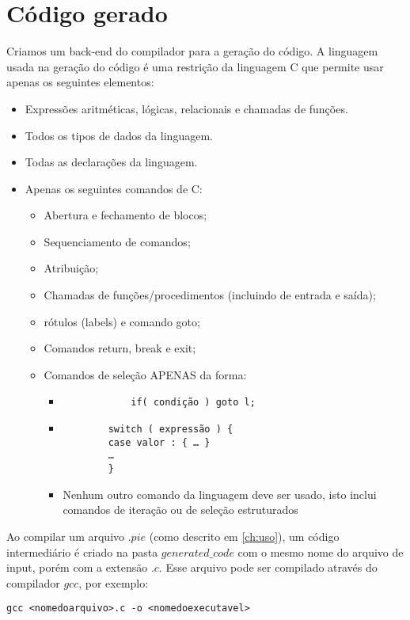 \section{Código gerado}
Criamos um back-end do compilador para a geração do código. 
A linguagem usada na geração do código é uma restrição da linguagem C que permite usar apenas os seguintes elementos:
\begin{itemize}
	\item Expressões aritméticas, lógicas, relacionais e chamadas de funções.
	\item Todos os tipos de dados da linguagem.
	\item Todas as declarações da linguagem.
	\item Apenas os seguintes comandos de C:
	\begin{itemize}
		\item Abertura e fechamento de blocos;
		\item Sequenciamento de comandos;
		\item Atribuição;
		\item Chamadas de funções/procedimentos (incluindo de entrada e saída);
		\item rótulos (labels) e comando goto;
		\item Comandos return, break e exit;
		\item Comandos de seleção APENAS da forma:
		\begin{itemize}
			\item \begin{verbatim}
			if( condição ) goto l;
			\end{verbatim}
			\item \begin{verbatim}
		switch ( expressão ) {
		case valor : { … }
		…
		}
		\end{verbatim}
		\item Nenhum outro comando da linguagem deve ser usado, isto inclui comandos de iteração ou de
		seleção estruturados	
		\end{itemize}
	\end{itemize}
\end{itemize}

Ao compilar um arquivo $.pie$ (como descrito em \ref{ch:uso}), um código intermediário é criado na pasta $generated\_code$ com o mesmo nome do arquivo de input, porém com a extensão $.c$. Esse arquivo pode ser compilado através do compilador $gcc$, por exemplo:
\begin{verbatim}
gcc <nomedoarquivo>.c -o <nomedoexecutavel>
\end{verbatim}

